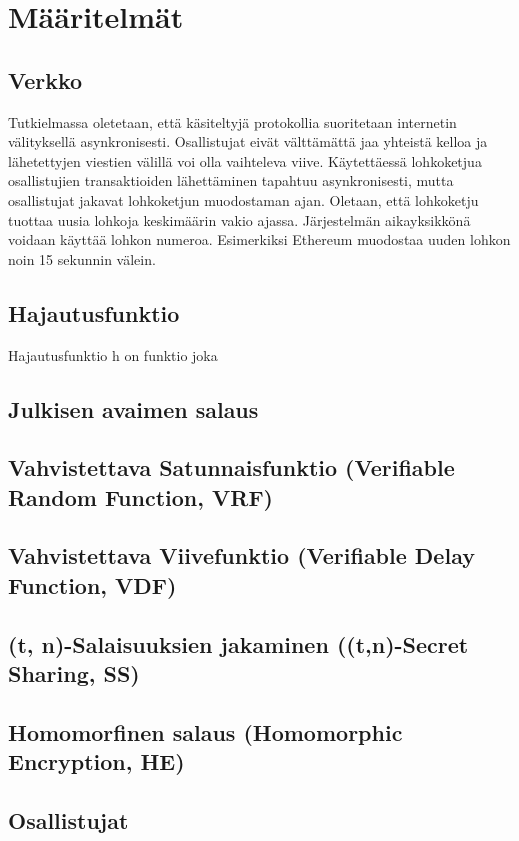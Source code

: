 \chapter{Määritelmät\label{methods}}

\section{Verkko}
Tutkielmassa oletetaan, että käsiteltyjä protokollia suoritetaan internetin välityksellä asynkronisesti. Osallistujat eivät välttämättä jaa yhteistä kelloa ja lähetettyjen viestien välillä voi olla vaihteleva viive. Käytettäessä lohkoketjua osallistujien transaktioiden lähettäminen tapahtuu asynkronisesti, mutta osallistujat jakavat lohkoketjun muodostaman ajan. Oletaan, että lohkoketju tuottaa uusia lohkoja keskimäärin vakio ajassa. Järjestelmän aikayksikkönä voidaan käyttää lohkon numeroa. Esimerkiksi Ethereum muodostaa uuden lohkon noin 15 sekunnin välein.

\section{Hajautusfunktio}
Hajautusfunktio h on funktio joka

\section{Julkisen avaimen salaus}

\section{Vahvistettava Satunnaisfunktio (Verifiable Random Function, VRF)}

\section{Vahvistettava Viivefunktio (Verifiable Delay Function, VDF)}

\section{(t, n)-Salaisuuksien jakaminen ((t,n)-Secret Sharing, SS)}

\section{Homomorfinen salaus (Homomorphic Encryption, HE)}

\section{Osallistujat}

